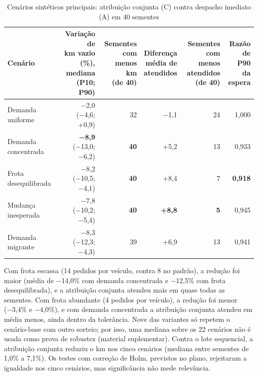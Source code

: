 \begin{table}[!htb]
\caption{Cenários sintéticos principais: atribuição conjunta (C) contra despacho imediato (A) em 40 sementes}\label{tab:sint}
\centering\fontetabela\setlength{\tabcolsep}{2.5pt}
\begin{tabular}{|l|r|r|r|r|r|}
\hline
Cenário & \shortstack{Variação de\\km vazio (\%),\\mediana (P10; P90)} & \shortstack{Sementes\\com menos km\\(de 40)} & \shortstack{Diferença\\média de\\atendidos} & \shortstack{Sementes com\\menos atendidos\\(de 40)} & \shortstack{Razão de\\P90 da\\espera} \\
\hline
Demanda uniforme & −2,0 (−4,6; +0,9) & 32 & −1,1 & 24 & 1,000 \\
\hline
Demanda concentrada & \textbf{−8,9} (−13,0; −6,2) & \textbf{40} & +5,2 & 13 & 0,933 \\
\hline
Frota desequilibrada & −8,2 (−10,5; −4,1) & \textbf{40} & +8,4 & 7 & \textbf{0,918} \\
\hline
Mudança inesperada & −7,8 (−10,2; −5,4) & \textbf{40} & \textbf{+8,8} & \textbf{5} & 0,945 \\
\hline
Demanda migrante & −8,3 (−12,3; −4,3) & 39 & +6,9 & 13 & 0,941 \\
\hline
\end{tabular}
\end{table}

Com frota escassa (14 pedidos por veículo, contra 8 no padrão), a redução foi maior (média de −14,0\% com demanda concentrada e −12,5\% com frota desequilibrada), e a atribuição conjunta atendeu mais em quase todas as sementes. Com frota abundante (4 pedidos por veículo), a redução foi menor (−3,4\% e −4,0\%), e com demanda concentrada a atribuição conjunta atendeu em média menos, ainda dentro da tolerância. Nove das variantes só repetem o cenário-base com outro sorteio; por isso, uma mediana sobre os 22 cenários não é usada como prova de robustez (material suplementar). Contra o lote sequencial, a atribuição conjunta reduziu o km nos cinco cenários (mediana entre sementes de 1,0\% a 7,1\%). Os testes com correção de Holm, previstos no plano, rejeitaram a igualdade nos cinco cenários, mas significância não mede relevância.

